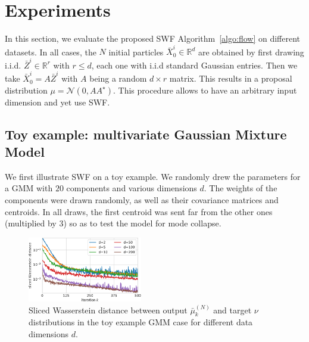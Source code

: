 
\section{Experiments}

In this section, we evaluate the proposed SWF Algorithm~\ref{algo:flow} on different datasets. In all cases, the $N$ initial particles $\bar{X}^i_0\in\mathbb{R}^d$ are obtained by first drawing i.i.d. $\bar{Z}^i\in\mathbb{R}^r$ with $r\leq d$, each one with i.i.d standard Gaussian entries. Then we take $\bar{X}^i_0=A\bar{Z}^i$ with $A$ being a random $d\times r$ matrix. This results in a proposal distribution $\mu=\mathcal{N}(0,AA^\star)$. This procedure allows to have an arbitrary input dimension and yet use SWF.

\subsection{Toy example: multivariate Gaussian Mixture Model}
\label{sub:toy_example}

We first illustrate SWF on a toy example. We randomly drew the parameters for a GMM with $20$ components and various dimensions $d$. The weights of the components were drawn randomly, as well as their covariance matrices and centroids. In all draws, the first centroid was sent far from the other ones (multiplied by $3$) so as to test the model for mode collapse.

\begin{figure}
\begin{centering}
\includegraphics[width=5cm]{figures/SW2_cost-crop.pdf}
\par\end{centering}
\caption{Sliced Wasserstein distance between output $\bar{\mu}_{k}^{(N)}$ and target $\nu$ distributions in the toy example GMM case for different data dimensions $d$.\label{fig:toy_sw}}
\end{figure}


